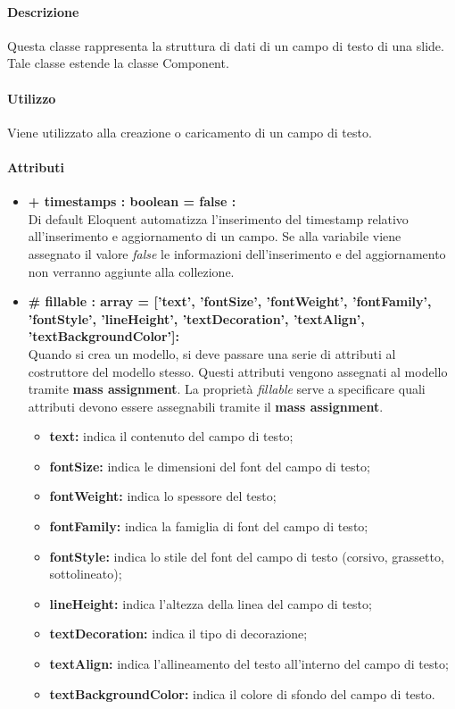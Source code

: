	\paragraph{Descrizione}
	Questa classe rappresenta la struttura di dati di un campo di testo di una slide. Tale classe estende la classe Component.
	
	\paragraph{Utilizzo}
	Viene utilizzato alla creazione o caricamento di un campo di testo.
	
	\paragraph{Attributi}
	\begin{itemize}
		\item \textbf{+ timestamps : boolean = false :}\\
		Di default Eloquent automatizza l'inserimento del timestamp relativo all'inserimento e aggiornamento di un campo. Se alla variabile viene assegnato il valore \textit{false} le informazioni dell'inserimento e del aggiornamento non verranno aggiunte alla collezione.
		\item \textbf{\# fillable : array = [’text’, ’fontSize’, ’fontWeight’, ’fontFamily’, ’fontStyle’, ’lineHeight’, ’textDecoration’, ’textAlign’, ’textBackgroundColor']:}\\
		Quando si crea un modello, si deve passare una serie di attributi al costruttore del modello stesso. Questi attributi vengono assegnati al modello tramite \textbf{mass assignment}. La proprietà \textit{fillable} serve a specificare quali attributi devono essere assegnabili tramite il \textbf{mass assignment}.
		\begin{itemize}
			\item \textbf{text:} indica il contenuto del campo di testo;
			\item \textbf{fontSize:} indica le dimensioni del font del campo di testo;
			\item \textbf{fontWeight:} indica lo spessore del testo;
			\item \textbf{fontFamily:} indica la famiglia di font del campo di testo;
			\item \textbf{fontStyle:} indica lo stile del font del campo di testo (corsivo, grassetto, sottolineato);
			\item \textbf{lineHeight:} indica l'altezza della linea del campo di testo;
			\item \textbf{textDecoration:} indica il tipo di decorazione;
			\item \textbf{textAlign:} indica l'allineamento del testo all'interno del campo di testo;
			\item \textbf{textBackgroundColor:} indica il colore di sfondo del campo di testo.
		\end{itemize}
	\end{itemize}
\newpage


